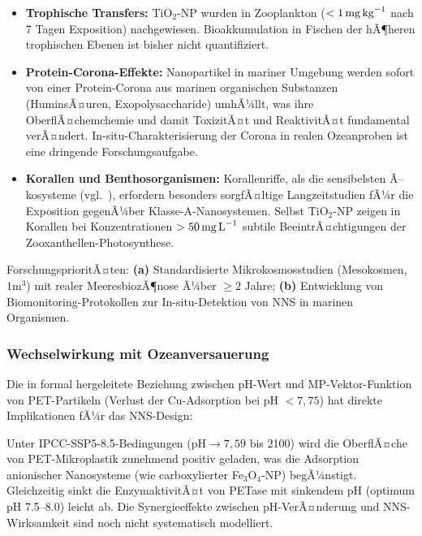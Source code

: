 ﻿\documentclass[12pt,a4paper]{article}
\theoremstyle{definition}
\theoremstyle{remark}
\begin{document}
\begin{itemize}
  \item \textbf{Trophische Transfers:} TiO$_2$-NP wurden in Zooplankton
        ($< 1\,\text{mg\,kg}^{-1}$ nach 7 Tagen Exposition) nachgewiesen.
        Bioakkumulation in Fischen der hÃ¶heren trophischen Ebenen ist bisher
        nicht quantifiziert.
  \item \textbf{Protein-Corona-Effekte:} Nanopartikel in mariner Umgebung
        werden sofort von einer Protein-Corona aus marinen organischen
        Substanzen (HuminsÃ¤uren, Exopolysaccharide) umhÃ¼llt, was ihre
        OberflÃ¤chemchemie und damit ToxizitÃ¤t und ReaktivitÃ¤t fundamental
        verÃ¤ndert. In-situ-Charakterisierung der Corona in realen
        Ozeanproben ist eine dringende Forschungsaufgabe.
  \item \textbf{Korallen und Benthosorganismen:} Korallenriffe, als die
        sensibelsten Ã–kosysteme (vgl.\ \cite{ocnscnce_epp2026}), erfordern
        besonders sorgfÃ¤ltige Langzeitstudien fÃ¼r die Exposition gegenÃ¼ber
        Klasse-A-Nanosystemen. Selbst TiO$_2$-NP zeigen in Korallen
        bei Konzentrationen $> 50\,\text{mg\,L}^{-1}$ subtile BeeintrÃ¤chtigungen
        der Zooxanthellen-Photosynthese.
\end{itemize}

ForschungsprioritÃ¤ten: \textbf{(a)} Standardisierte Mikrokosmosstudien
(Mesokosmen, $1\text{m}^3$) mit realer MeeresbiozÃ¶nose Ã¼ber $\geq 2$ Jahre;
\textbf{(b)} Entwicklung von Biomonitoring-Protokollen zur In-situ-Detektion
von NNS in marinen Organismen.

\subsubsection{Wechselwirkung mit Ozeanversauerung}

Die in \cite{ocnscnce_epp2026} formal hergeleitete Beziehung zwischen
pH-Wert und MP-Vektor-Funktion von PET-Partikeln (Verlust der Cu-Adsorption
bei pH $< 7{,}75$) hat direkte Implikationen fÃ¼r das NNS-Design:

Unter IPCC-SSP5-8.5-Bedingungen ($\text{pH} \to 7{,}59$ bis 2100) wird die
OberflÃ¤che von PET-Mikro\-plastik zunehmend positiv geladen, was die
Adsorption anionischer Nanosysteme (wie carboxylierter Fe$_3$O$_4$-NP)
begÃ¼nstigt. Gleichzeitig sinkt die EnzymaktivitÃ¤t von PETase mit sinkendem
pH (optimum pH 7.5--8.0) leicht ab. Die Synergieeffekte zwischen
pH-VerÃ¤nderung und NNS-Wirksamkeit sind noch nicht systematisch modelliert.
\end{document}
